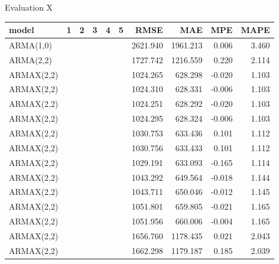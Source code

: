 \documentclass[t,xcolor={table},fleqn]{beamer}
\newcommand{\cmark}{\color{darkgreen}\ding{51}}%
\newcommand{\xmark}{\color{darkred}\ding{55}}%
\begin{document}
\begin{frame}{Evaluation X}

\begin{table}[!ht]%
\centering
\scriptsize
\begin{tabularx}{\linewidth}{Xlllllrrrr}
\textbf{model} & \textbf{1} & \textbf{2} & \textbf{3} & \textbf{4} & \textbf{5} & \textbf{RMSE} & \textbf{MAE} & \textbf{MPE} & \textbf{MAPE}\\\hline
ARMA(1,0) & \xmark & \xmark & \xmark & \xmark & \xmark & 2621.940 & 1961.213 & 0.006 & 3.460\\
ARMA(2,2) & \xmark & \xmark & \xmark & \xmark & \xmark & 1727.742 & 1216.559 & 0.220 & 2.114\\
ARMAX(2,2) & \cmark & \cmark & \xmark & \xmark & \xmark & 1024.265 & 628.298 & -0.020 & \cellcolor{green!35}1.103\\
ARMAX(2,2) & \cmark & \cmark & \cmark & \xmark & \xmark & 1024.310 & 628.331 & -0.006 & \cellcolor{green!35}1.103\\
ARMAX(2,2) & \cmark & \cmark & \xmark & \cmark & \xmark & \cellcolor{green!35}1024.251 & \cellcolor{green!35}628.292 & -0.020 & \cellcolor{green!35}1.103\\
ARMAX(2,2) & \cmark & \cmark & \cmark & \cmark & \xmark & 1024.295 & 628.324 & -0.006 & \cellcolor{green!35}1.103\\
ARMAX(2,2) & \cmark & \xmark & \xmark & \xmark & \xmark & 1030.753 & 633.436 & 0.101 & 1.112\\
ARMAX(2,2) & \cmark & \xmark & \xmark & \cmark & \xmark & 1030.756 & 633.433 & 0.101 & 1.112\\
ARMAX(2,2) & \cmark & \xmark & \cmark & \xmark & \xmark & 1029.191 & 633.093 & -0.165 & 1.114\\
ARMAX(2,2) & \cmark & \xmark & \xmark & \xmark & \cmark & 1043.292 & 649.564 & -0.018 & 1.144\\
ARMAX(2,2) & \cmark & \xmark & \cmark & \xmark & \cmark & 1043.711 & 650.046 & -0.012 & 1.145\\
ARMAX(2,2) & \cmark & \cmark & \xmark & \cmark & \cmark & 1051.801 & 659.805 & -0.021 & 1.165\\
ARMAX(2,2) & \cmark & \cmark & \cmark & \cmark & \cmark & 1051.956 & 660.006 & \cellcolor{green!35}-0.004 & 1.165\\
ARMAX(2,2) & \cmark & \xmark & \cmark & \xmark & \xmark & 1656.760 & 1178.435 & 0.021 & 2.043\\
ARMAX(2,2) & \xmark & \cmark & \xmark & \xmark & \xmark & 1662.298 & 1179.187 & 0.185 & 2.039\\

\end{tabularx}
\end{table}
\end{frame}
\end{document}

